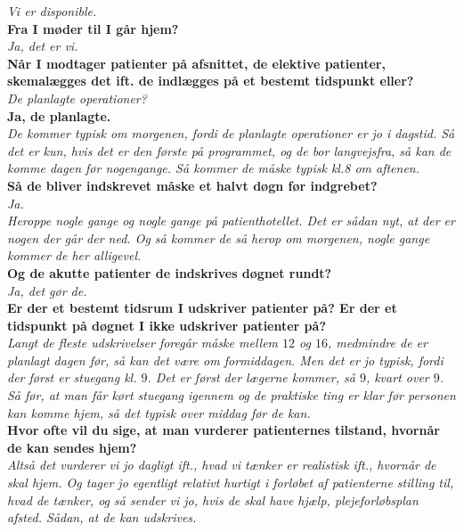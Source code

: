 \noindent
\textit{Vi er disponible.} \\
\noindent
\textbf{Fra I møder til I går hjem?} \\
\noindent
\textit{Ja, det er vi.}  \\
\noindent
\textbf{Når I modtager patienter på afsnittet, de elektive patienter, skemalægges det ift. de indlægges på et bestemt tidspunkt eller?}\\
\noindent
\textit{De planlagte operationer?} \\
\noindent
\textbf{Ja, de planlagte.} \\
\noindent
\textit{De kommer typisk om morgenen, fordi de planlagte operationer er jo i dagstid. Så det er kun, hvis det er den første på programmet, og de bor langvejsfra, så kan de komme dagen før nogengange. Så kommer de måske typisk kl.8 om aftenen.} \\
\noindent
\textbf{Så de bliver indskrevet måske et halvt døgn før indgrebet?} \\
\noindent
\textit{Ja.} \\
\noindent
\textit{Heroppe nogle gange og nogle gange på patienthotellet. Det er sådan nyt, at der er nogen der går der ned. Og så kommer de så herop om morgenen, nogle gange kommer de her alligevel.} \\
\noindent
\textbf{Og de akutte patienter de indskrives døgnet rundt?} \\
\noindent
\textit{Ja, det gør de.} \\
\noindent
\textbf{Er der et bestemt tidsrum I udskriver patienter på? Er der et tidspunkt på døgnet I ikke udskriver patienter på?} \\
\noindent
\textit{Langt de fleste udskrivelser foregår måske mellem $12$ og $16$, medmindre de er planlagt dagen før, så kan det være om formiddagen. Men det er jo typisk, fordi der først er stuegang kl. $9$. Det er først der lægerne kommer, så $9$, kvart over $9$. Så før, at man får kørt stuegang igennem og de praktiske ting er klar før personen kan komme hjem, så det typisk over middag før de kan.} \\
\noindent
\textbf{Hvor ofte vil du sige, at man vurderer patienternes tilstand, hvornår de kan sendes hjem?}  \\
\noindent
\textit{Altså det vurderer vi jo dagligt ift., hvad vi tænker er realistisk ift., hvornår de skal hjem. Og tager jo egentligt relativt hurtigt i forløbet af patienterne stilling til, hvad de tænker, og så sender vi jo, hvis de skal have hjælp, plejeforløbsplan afsted. Sådan, at de kan udskrives.} \\
